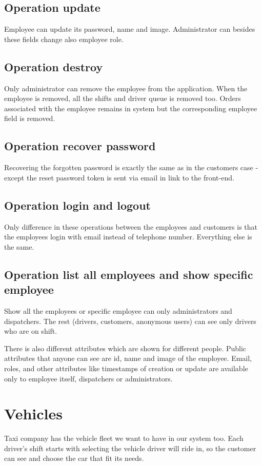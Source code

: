 		\subsection{Operation update}		
		Employee can update its password, name and image. Administrator can besides these fields change also employee role.
		\subsection{Operation destroy}
		Only administrator can remove the employee from the application. When the employee is removed, all the shifts and driver queue is removed too. Orders associated with the employee remains in system but the corresponding employee field is removed.
		\subsection{Operation recover password}
		Recovering the forgotten password is exactly the same as in the customers case - except the reset password token is sent via email in link to the front-end.
		\subsection{Operation login and logout}
		Only difference in these operations between the employees and customers is that the employees login with email instead of telephone number. Everything else is the same.
		\subsection{Operation list all employees and show specific employee}
		Show all the employees or specific employee can only administrators and dispatchers. The rest (drivers, customers, anonymous users) can see only drivers who are on shift.
		
		There is also different attributes which are shown for different people. Public attributes that anyone can see are id, name and image of the employee. Email, roles, and other attributes like timestamps of creation or update are available only to employee itself, dispatchers or administrators.
	
	\section{Vehicles}
		Taxi company has the vehicle fleet we want to have in our system too. Each driver's shift starts with selecting the vehicle driver will ride in, so the customer can see and choose the car that fit its needs.
		
